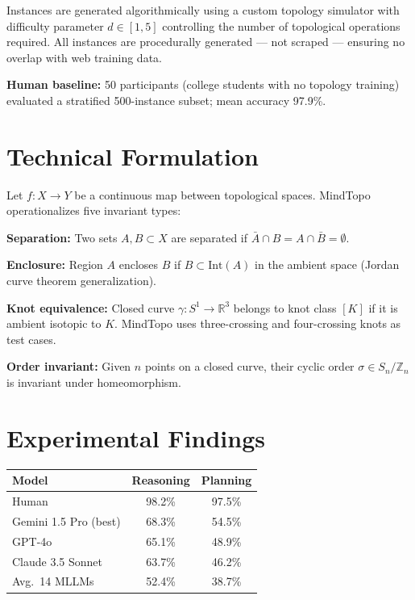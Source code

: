 \documentclass[10pt,twocolumn]{article}
\begin{document}
Instances are generated algorithmically using a custom topology
simulator with difficulty parameter $d \in [1,5]$ controlling the
number of topological operations required. All instances are
procedurally generated --- not scraped --- ensuring no overlap with
web training data.

\textbf{Human baseline:} 50 participants (college students with no
topology training) evaluated a stratified 500-instance subset; mean
accuracy 97.9\%.

\section{Technical Formulation}

Let $f: X \to Y$ be a continuous map between topological spaces.
MindTopo operationalizes five invariant types:

\textbf{Separation:} Two sets $A, B \subset X$ are separated if
$\bar{A} \cap B = A \cap \bar{B} = \emptyset$.

\textbf{Enclosure:} Region $A$ encloses $B$ if $B \subset \mathrm{Int}(A)$
in the ambient space (Jordan curve theorem generalization).

\textbf{Knot equivalence:} Closed curve $\gamma: S^1 \to \mathbb{R}^3$
belongs to knot class $[K]$ if it is ambient isotopic to $K$.
MindTopo uses three-crossing and four-crossing knots as test cases.

\textbf{Order invariant:} Given $n$ points on a closed curve, their
cyclic order $\sigma \in S_n / \mathbb{Z}_n$ is invariant under
homeomorphism.

\section{Experimental Findings}

\begin{center}
\begin{tabular}{lcc}
\toprule
Model & Reasoning & Planning \\
\midrule
Human                  & 98.2\% & 97.5\% \\
Gemini 1.5 Pro (best)  & 68.3\% & 54.5\% \\
GPT-4o                 & 65.1\% & 48.9\% \\
Claude 3.5 Sonnet      & 63.7\% & 46.2\% \\
Avg.\ 14 MLLMs         & 52.4\% & 38.7\% \\
\bottomrule
\end{tabular}
\end{center}
\end{document}
